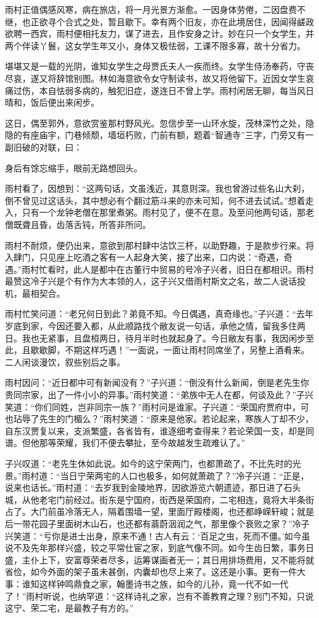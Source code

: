 雨村正值偶感风寒，病在旅店，将一月光景方渐愈。一因身体劳倦，二因盘费不继，也正欲寻个合式之处，暂且歇下。幸有两个旧友，亦在此境居住，因闻得鹾政欲聘一西宾，雨村便相托友力，谋了进去，且作安身之计。妙在只一个女学生，并两个伴读丫鬟，这女学生年又小，身体又极怯弱，工课不限多寡，故十分省力。

堪堪又是一载的光阴，谁知女学生之母贾氏夫人一疾而终。女学生侍汤奉药，守丧尽哀，遂又将辞馆别图。林如海意欲令女守制读书，故又将他留下。近因女学生哀痛过伤，本自怯弱多病的，触犯旧症，遂连日不曾上学。雨村闲居无聊，每当风日晴和，饭后便出来闲步。

这日，偶至郭外，意欲赏鉴那村野风光。忽信步至一山环水旋，茂林深竹之处，隐隐的有座庙宇，门巷倾颓，墙垣朽败，门前有额，题着“智通寺”三字，门旁又有一副旧破的对联，曰：

身后有馀忘缩手，眼前无路想回头。

雨村看了，因想到：“这两句话，文虽浅近，其意则深。我也曾游过些名山大刹，倒不曾见过这话头，其中想必有个翻过筋斗来的亦未可知，何不进去试试。”想着走入，只有一个龙钟老僧在那里煮粥。雨村见了，便不在意。及至问他两句话，那老僧既聋且昏，齿落舌钝，所答非所问。

雨村不耐烦，便仍出来，意欲到那村肆中沽饮三杯，以助野趣，于是款步行来。将入肆门，只见座上吃酒之客有一人起身大笑，接了出来，口内说：“奇遇，奇遇。”雨村忙看时，此人是都中在古董行中贸易的号冷子兴者，旧日在都相识。雨村最赞这冷子兴是个有作为大本领的人，这子兴又借雨村斯文之名，故二人说话投机，最相契合。

雨村忙笑问道：“老兄何日到此？弟竟不知。今日偶遇，真奇缘也。”子兴道：“去年岁底到家，今因还要入都，从此顺路找个敝友说一句话，承他之情，留我多住两日。我也无紧事，且盘桓两日，待月半时也就起身了。今日敝友有事，我因闲步至此，且歇歇脚，不期这样巧遇！”一面说，一面让雨村同席坐了，另整上酒肴来。二人闲谈漫饮，叙些别后之事。

雨村因问：“近日都中可有新闻没有？”子兴道：“倒没有什么新闻，倒是老先生你贵同宗家，出了一件小小的异事。”雨村笑道：“弟族中无人在都，何谈及此？”子兴笑道：“你们同姓，岂非同宗一族？”雨村问是谁家。子兴道：“荣国府贾府中，可也玷辱了先生的门楣么？”雨村笑道：“原来是他家。若论起来，寒族人丁却不少，自东汉贾复以来，支派繁盛，各省皆有，谁逐细考查得来？若论荣国一支，却是同谱。但他那等荣耀，我们不便去攀扯，至今故越发生疏难认了。”

子兴叹道：“老先生休如此说。如今的这宁荣两门，也都萧疏了，不比先时的光景。”雨村道：“当日宁荣两宅的人口也极多，如何就萧疏了？”冷子兴道：“正是，说来也话长。”雨村道：“去岁我到金陵地界，因欲游览六朝遗迹，那日进了石头城，从他老宅门前经过。街东是宁国府，街西是荣国府，二宅相连，竟将大半条街占了。大门前虽冷落无人，隔着围墙一望，里面厅殿楼阁，也还都峥嵘轩峻；就是后一带花园子里面树木山石，也还都有蓊蔚洇润之气，那里像个衰败之家？”冷子兴笑道：“亏你是进士出身，原来不通！古人有云：‘百足之虫，死而不僵。’如今虽说不及先年那样兴盛，较之平常仕宦之家，到底气像不同。如今生齿日繁，事务日盛，主仆上下，安富尊荣者尽多，运筹谋画者无一；其日用排场费用，又不能将就省俭，如今外面的架子虽未甚倒，内囊却也尽上来了。这还是小事。更有一件大事：谁知这样钟鸣鼎食之家，翰墨诗书之族，如今的儿孙，竟一代不如一代了！”雨村听说，也纳罕道：“这样诗礼之家，岂有不善教育之理？别门不知，只说这宁、荣二宅，是最教子有方的。”

